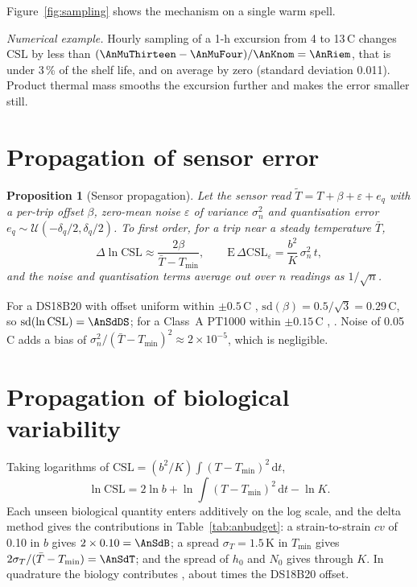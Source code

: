\documentclass[11pt,a4paper,twoside,openany]{book}
\newcommand{\CSL}{\mathrm{CSL}}
\newcommand{\dd}{\,\mathrm{d}}
\newcommand{\degC}{\,\textdegree C}
\theoremstyle{plain}\newtheorem{proposition}{Proposition}\newtheorem{corollary}{Corollary}
\theoremstyle{definition}\newtheorem{definition}{Definition}[chapter]
\newenvironment{worked}{\par\smallskip\noindent\textit{Numerical example.}\enspace}{\par\smallskip}
\begin{document}
Figure~\ref{fig:sampling} shows the mechanism on a single warm spell.

\begin{worked}
Hourly sampling of a 1-h excursion from 4 to 13\degC{} changes $\CSL$ by less than $(\AnMuThirteen-\AnMuFour)/\AnKnom=\AnRiem$, that is under 3\,\% of the shelf life, and on average by zero (standard deviation 0.011). Product thermal mass smooths the excursion further and makes the error smaller still.
\end{worked}


\section{Propagation of sensor error}
\begin{proposition}[Sensor propagation]\label{prop:sensor}
Let the sensor read $\tilde T=T+\beta+\varepsilon+e_q$ with a per-trip offset $\beta$, zero-mean noise $\varepsilon$ of variance $\sigma_n^2$ and quantisation error $e_q\sim\mathcal U(-\delta_q/2,\delta_q/2)$. To first order, for a trip near a steady temperature $\bar T$,
\begin{equation}\label{eq:sensor}
\Delta\ln\CSL\approx\frac{2\beta}{\bar T-T_{\min}},\qquad \mathrm{E}\,\Delta\CSL_{\varepsilon}=\frac{b^2}{K}\,\sigma_n^2\,t,
\end{equation}
and the noise and quantisation terms average out over $n$ readings as $1/\sqrt n$.
\end{proposition}
For a DS18B20 with offset uniform within $\pm0.5$\degC{} \cite{ds18b20}, $\mathrm{sd}(\beta)=0.5/\sqrt3=0.29$\degC, so $\mathrm{sd}(\ln\CSL)=\AnSdDS$; for a Class~A PT1000 within $\pm0.15$\degC{} \cite{iec60751}, \AnSdPT. Noise of 0.05\degC{} adds a bias of $\sigma_n^2/(\bar T-T_{\min})^2\approx2\times10^{-5}$, which is negligible.

\section{Propagation of biological variability}
Taking logarithms of $\CSL=(b^2/K)\int(T-T_{\min})^2\dd t$,
\begin{equation}\label{eq:lncsl}
\ln\CSL=2\ln b+\ln\!\int(T-T_{\min})^2\dd t-\ln K .
\end{equation}
Each unseen biological quantity enters additively on the log scale, and the delta method gives the contributions in Table~\ref{tab:anbudget}: a strain-to-strain $cv$ of 0.10 in $b$ gives $2\times0.10=\AnSdB$; a spread $\sigma_T=1.5$\,K in $T_{\min}$ gives $2\sigma_T/(\bar T-T_{\min})=\AnSdT$; and the spread of $h_0$ and $N_0$ gives \AnSdK{} through $K$. In quadrature the biology contributes \AnSdBio, about \AnRatio{} times the DS18B20 offset.
\end{document}
